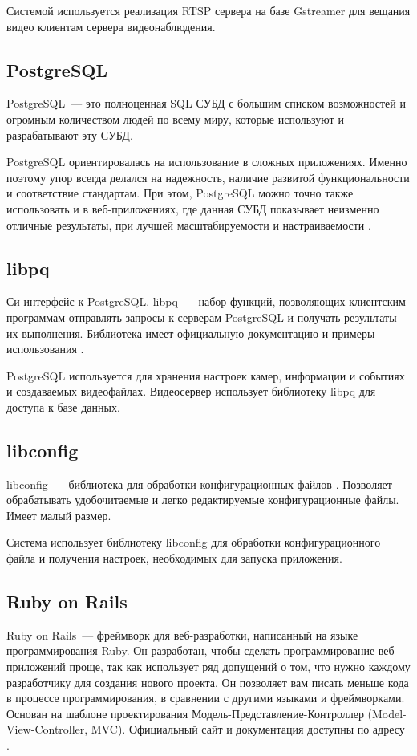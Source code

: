 Системой используется реализация RTSP сервера \cite{gst_rtsp_server} на базе Gstreamer для вещания видео клиентам сервера
видеонаблюдения.

\subsection{PostgreSQL}
PostgreSQL~--- это полноценная SQL СУБД с большим списком возможностей и огромным количеством
людей по всему миру, которые используют и разрабатывают эту СУБД.

PostgreSQL ориентировалась на использование в сложных приложениях. Именно поэтому упор всегда делался
на надежность, наличие развитой функциональности и соответствие стандартам. При этом, PostgreSQL
можно точно также использовать и в веб-приложениях, где данная СУБД показывает неизменно отличные
результаты, при лучшей масштабируемости и настраиваемости \cite{about_pgsql}.

\subsection{libpq}
Си интерфейс к PostgreSQL. libpq~--- набор функций, позволяющих клиентским программам
отправлять запросы к серверам PostgreSQL и получать результаты их выполнения.
Библиотека имеет официальную документацию и примеры использования \cite{libpq_doc}.

PostgreSQL используется для хранения настроек камер, информации и событиях и создаваемых видеофайлах.
Видеосервер использует библиотеку libpq для доступа к базе данных.

\subsection{libconfig}
libconfig~--- библиотека для обработки конфигурационных файлов \cite{libconfig_doc}.
Позволяет обрабатывать удобочитаемые и легко редактируемые конфигурационные файлы.
Имеет малый размер.

Система использует библиотеку libconfig для обработки конфигурационного файла и получения настроек,
необходимых для запуска приложения.

\subsection{Ruby on Rails}
Ruby on Rails~--- фреймворк для веб-разработки, написанный на языке программирования Ruby.
Он разработан, чтобы сделать программирование веб-приложений проще, так как использует ряд допущений
о том, что нужно каждому разработчику для создания нового проекта. Он позволяет вам писать меньше
кода в процессе программирования, в сравнении с другими языками и фреймворками. Основан на
шаблоне проектирования Модель-Представление-Контроллер (Model-View-Controller, MVC).
Официальный сайт и документация доступны по адресу \cite{ror}.

